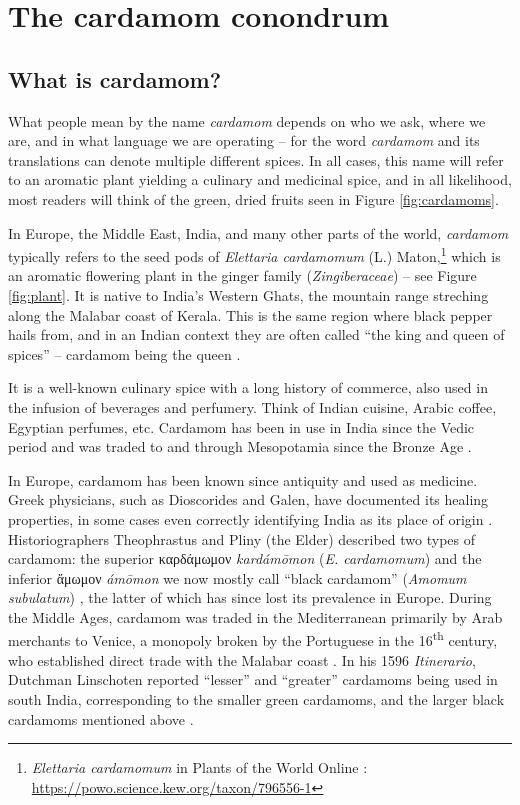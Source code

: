 \documentclass[12pt]{article}
\begin{document}
\section{The cardamom conondrum}\label{sec:plants}

\subsection{What is cardamom?}

What people mean by the name \textit{cardamom} depends on who we ask, where we are, and in what language we are operating -- for the word \textit{cardamom} and its translations can denote multiple different spices. In all cases, this name will refer to an aromatic plant yielding a culinary and medicinal spice, and in all likelihood, most readers will think of the green, dried fruits seen in Figure \ref{fig:cardamoms}.

In Europe, the Middle East, India, and many other parts of the world, \textit{cardamom} typically refers to the seed pods of \textit{Elettaria cardamomum} (L.) Maton,\footnote{\textit{Elettaria cardamomum} in Plants of the World Online \parencite{powo}: \url{https://powo.science.kew.org/taxon/796556-1}} which is an aromatic flowering plant in the ginger family (\textit{Zingiberaceae}) -- see Figure \ref{fig:plant}. It is native to India's Western Ghats, the mountain range streching along the Malabar coast of Kerala. This is the same region where black pepper hails from, and in an Indian context they are often called ``the king and queen of spices'' -- cardamom being the queen \parencite{nair_2020_geographya}. 

It is a well-known culinary spice with a long history of commerce, also used in the infusion of beverages and perfumery. Think of Indian cuisine, Arabic coffee, Egyptian perfumes, etc. Cardamom has been in use in India since the Vedic period and was traded to and through Mesopotamia since the Bronze Age \parencite{ravindran_2002_cardamom}. 

In Europe, cardamom has been known since antiquity and used as medicine. Greek physicians, such as Dioscorides and Galen, have documented its healing properties, in some cases even correctly identifying India as its place of origin \parencites{parry_1969_spices}{anderson_2023_history}. Historiographers Theophrastus and Pliny (the Elder) described two types of cardamom: the superior καρδάμωμον \textit{kardámōmon} (\textit{E. cardamomum}) and the inferior ἄμωμον \textit{ámōmon} we now mostly call ``black cardamom'' (\textit{Amomum subulatum}) \parencite{prance_2005_cultural}, the latter of which has since lost its prevalence in Europe. During the Middle Ages, cardamom was traded in the Mediterranean primarily by Arab merchants to Venice, a monopoly broken by the Portuguese in the 16\textsuperscript{th} century, who established direct trade with the Malabar coast \parencite{cumo_2013_encyclopedia}. In his 1596 \textit{Itinerario}, Dutchman Linschoten reported ``lesser'' and ``greater'' cardamoms being used in south India, corresponding to the smaller green cardamoms, and the larger black cardamoms mentioned above \parencite{nair_2006_agronomy}.
\end{document}
